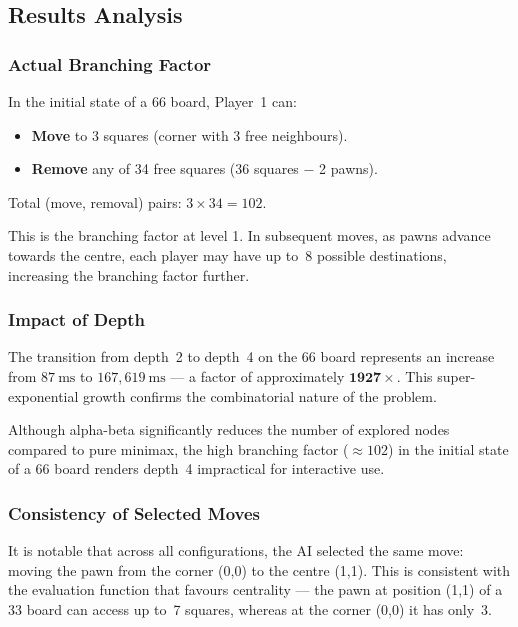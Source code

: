 \subsection{Results Analysis}

\subsubsection{Actual Branching Factor}

In the initial state of a 6{\texttimes}6 board, Player~1 can:
\begin{itemize}
  \item \textbf{Move} to 3 squares (corner with 3 free neighbours).
  \item \textbf{Remove} any of 34 free squares
        (36 squares $-$ 2 pawns).
\end{itemize}

Total (move, removal) pairs: $3 \times 34 = 102$.

This is the branching factor at level 1. In subsequent moves,
as pawns advance towards the centre, each player may have up to~8
possible destinations, increasing the branching factor further.

\subsubsection{Impact of Depth}

The transition from depth~2 to depth~4 on the 6{\texttimes}6 board
represents an increase from $87~\text{ms}$ to $167{,}619~\text{ms}$ ---
a factor of approximately $\mathbf{1927\times}$. This super-exponential
growth confirms the combinatorial nature of the problem.

Although alpha-beta significantly reduces the number of explored nodes
compared to pure minimax, the high branching factor ($\approx 102$) in the
initial state of a 6{\texttimes}6 board renders depth~4 impractical for
interactive use.

\subsubsection{Consistency of Selected Moves}

It is notable that across all configurations, the AI selected the
same move: moving the pawn from the corner (0,0) to the centre (1,1).
This is consistent with the evaluation function that favours
centrality --- the pawn at position (1,1) of a 3{\texttimes}3 board
can access up to~7 squares, whereas at the corner (0,0) it has only~3.

